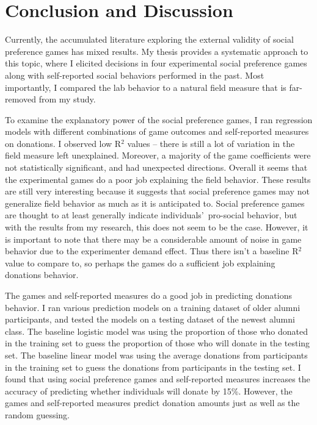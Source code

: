 \documentclass[12pt]{article}
\begin{document}
\section{Conclusion and Discussion}

Currently, the accumulated literature exploring the external validity of social preference games has mixed results. My thesis provides a systematic approach to this topic, where I elicited decisions in four experimental social preference games along with self-reported social behaviors performed in the past. Most importantly, I compared the lab behavior to a natural field measure that is far-removed from my study.

To examine the explanatory power of the social preference games, I ran regression models with different combinations of game outcomes and self-reported measures on donations. I observed low R$^{2}$ values -- there is still a lot of variation in the field measure left unexplained. Moreover, a majority of the game coefficients were not statistically significant, and had unexpected directions. Overall it seems that the experimental games do a poor job explaining the field behavior. These results are still very interesting because it suggests that social preference games may not generalize field behavior as much as it is anticipated to. Social preference games are thought to at least generally indicate individuals\rq \ pro-social behavior, but with the results from my research, this does not seem to be the case. However, it is important to note that there may be a considerable amount of noise in game behavior due to the experimenter demand effect. Thus there isn\rq t a baseline R$^{2}$ value to compare to, so perhaps the games do a sufficient job explaining donations behavior.

The games and self-reported measures do a good job in predicting donations behavior. I ran various prediction models on a training dataset of older alumni participants, and tested the models on a testing dataset of the newest alumni class. The baseline logistic model was using the proportion of those who donated in the training set to guess the proportion of those who will donate in the testing set. The baseline linear model was using the average donations from participants in the training set to guess the donations from participants in the testing set. I found that using social preference games and self-reported measures increases the accuracy of predicting whether individuals will donate by 15\%. However, the games and self-reported measures predict donation amounts just as well as the random guessing.
\end{document}

